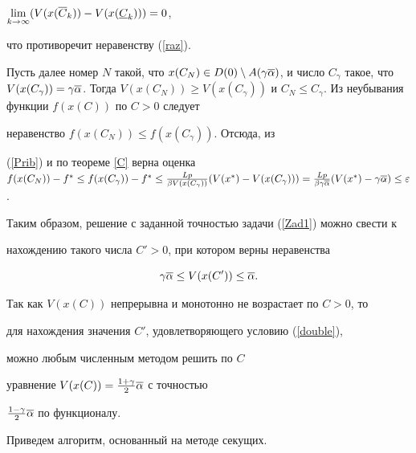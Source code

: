 \begin{pf}
$\lim\limits_{k\to\infty}(V(x(\overline C_k))-V(x(\underline C_k)))=0$,


что противоречит неравенству (\ref{raz}).





Пусть далее номер $N$ такой, что $x(C_N)\in D(0)\setminus A(\gamma


\o\alpha)$, и число $C_\gamma$ такое, что $V(x(C_\gamma))=\gamma


\o\alpha$. Тогда $V(x(C_N))\geq V(x(C_\gamma))$ и $C_N\leq


C_\gamma$. Из неубывания функции $f(x(C))$ по $C>0$ следует


неравенство $f(x(C_N))\leq f(x(C_\gamma))$. Отсюда, из


(\ref{Prib}) и по теореме \ref{C} верна оценка $f(x(C_N))-f^*\leq


f(x(C_\gamma))-f^*\leq\frac{Lp}{\beta


V(x(C_\gamma))}(V(x^*)-V(x(C_\gamma)))= \frac{Lp}{\beta\gamma


\o\alpha}(V(x^*)-\gamma \o\alpha)\leq\varepsilon$.


\end{pf}





Таким образом, решение с заданной точностью задачи (\ref{Zad1}) можно свести к


нахождению такого числа $C'>0$, при котором верны неравенства


\begin{equation}\label{double}


\gamma\o\alpha\leq V(x(C'))\leq\o\alpha.


\end{equation}


Так как $V(x(C))$ непрерывна и монотонно не возрастает по $C>0$, то


для нахождения значения $C'$, удовлетворяющего условию (\ref{double}),


можно любым численным методом решить по $C$


уравнение $V(x(C))=\frac{1+\gamma}{2}\overline\alpha$ с точностью 


$\frac{1-\gamma}{2}\overline\alpha$ по функционалу.


Приведем алгоритм, основанный на методе секущих.





